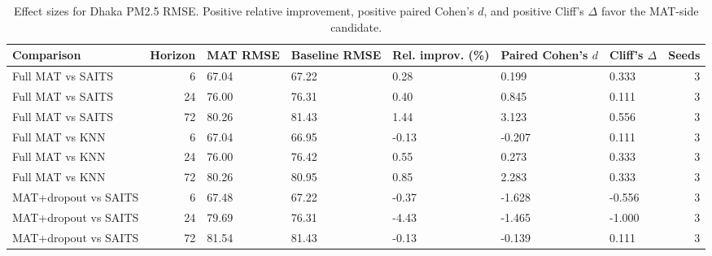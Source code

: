 \begin{table}
\caption{Effect sizes for Dhaka PM2.5 RMSE. Positive relative improvement, positive paired Cohen's $d$, and positive Cliff's $\Delta$ favor the MAT-side candidate.}
\label{tab:effect_sizes}
\begin{tabular}{lrlllllr}
\toprule
Comparison & Horizon & MAT RMSE & Baseline RMSE & Rel. improv. (\%) & Paired Cohen's $d$ & Cliff's $\Delta$ & Seeds \\
\midrule
Full MAT vs SAITS & 6 & 67.04 & 67.22 & 0.28 & 0.199 & 0.333 & 3 \\
Full MAT vs SAITS & 24 & 76.00 & 76.31 & 0.40 & 0.845 & 0.111 & 3 \\
Full MAT vs SAITS & 72 & 80.26 & 81.43 & 1.44 & 3.123 & 0.556 & 3 \\
Full MAT vs KNN & 6 & 67.04 & 66.95 & -0.13 & -0.207 & 0.111 & 3 \\
Full MAT vs KNN & 24 & 76.00 & 76.42 & 0.55 & 0.273 & 0.333 & 3 \\
Full MAT vs KNN & 72 & 80.26 & 80.95 & 0.85 & 2.283 & 0.333 & 3 \\
MAT+dropout vs SAITS & 6 & 67.48 & 67.22 & -0.37 & -1.628 & -0.556 & 3 \\
MAT+dropout vs SAITS & 24 & 79.69 & 76.31 & -4.43 & -1.465 & -1.000 & 3 \\
MAT+dropout vs SAITS & 72 & 81.54 & 81.43 & -0.13 & -0.139 & 0.111 & 3 \\
\bottomrule
\end{tabular}
\end{table}
